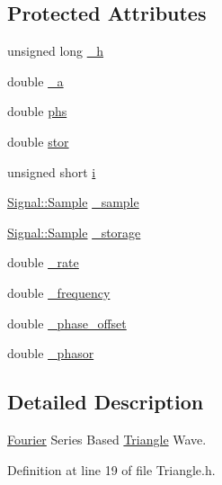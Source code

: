 \subsection*{Protected Attributes}
\begin{DoxyCompactItemize}
\item 
unsigned long \hyperlink{classDSG_1_1Fourier_1_1Triangle_a86f099481a438238a44fe3f8a8215e4f}{\-\_\-h}
\item 
double \hyperlink{classDSG_1_1Fourier_1_1Triangle_a6ab2afb0d0d51d395e49bfe470196a1e}{\-\_\-a}
\item 
double \hyperlink{classDSG_1_1Fourier_1_1Triangle_aa2f376ac6bb99284a5ff97a5e9adaec9}{phs}
\item 
double \hyperlink{classDSG_1_1Fourier_1_1Triangle_ae841650a157ead082b83c3cf1154a2f0}{stor}
\item 
unsigned short \hyperlink{classDSG_1_1Fourier_1_1Triangle_af81a809f2d901e42a398f13f090a5472}{i}
\item 
\hyperlink{classDSG_1_1Signal_1_1Sample}{Signal\-::\-Sample} \hyperlink{classDSG_1_1Fourier_1_1FourierGenerator_aaf63683d2173cd41ff1d65b4c454e87a}{\-\_\-sample}
\item 
\hyperlink{classDSG_1_1Signal_1_1Sample}{Signal\-::\-Sample} \hyperlink{classDSG_1_1Fourier_1_1FourierGenerator_a43799227375e2d8b1354682e3a4fc935}{\-\_\-storage}
\item 
double \hyperlink{classDSG_1_1SignalGenerator_aa10f6c85d9adee901139ea7fb346f39d}{\-\_\-rate}
\item 
double \hyperlink{classDSG_1_1SignalGenerator_a67e296e3506dcdf09402c667cddff9ac}{\-\_\-frequency}
\item 
double \hyperlink{classDSG_1_1SignalGenerator_a9abf9d00c798e0fdca6314f17547758a}{\-\_\-phase\-\_\-offset}
\item 
double \hyperlink{classDSG_1_1SignalGenerator_ac2271b582bf699275f077ecb642a8cd9}{\-\_\-phasor}
\end{DoxyCompactItemize}


\subsection{Detailed Description}
\hyperlink{namespaceDSG_1_1Fourier}{Fourier} Series Based \hyperlink{classDSG_1_1Fourier_1_1Triangle}{Triangle} Wave. 

Definition at line 19 of file Triangle.\-h.



